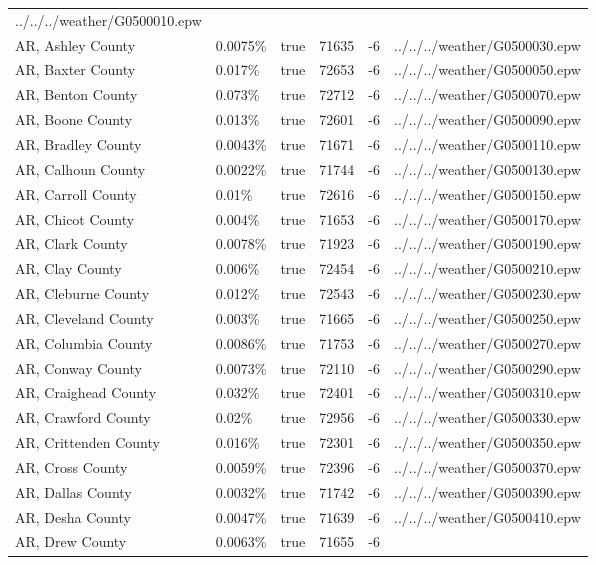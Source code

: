 \begin{longtable}[]{@{}llllll@{}}
../../../weather/G0500010.epw \\
AR, Ashley County & 0.0075\% & true & 71635 & -6 &
../../../weather/G0500030.epw \\
AR, Baxter County & 0.017\% & true & 72653 & -6 &
../../../weather/G0500050.epw \\
AR, Benton County & 0.073\% & true & 72712 & -6 &
../../../weather/G0500070.epw \\
AR, Boone County & 0.013\% & true & 72601 & -6 &
../../../weather/G0500090.epw \\
AR, Bradley County & 0.0043\% & true & 71671 & -6 &
../../../weather/G0500110.epw \\
AR, Calhoun County & 0.0022\% & true & 71744 & -6 &
../../../weather/G0500130.epw \\
AR, Carroll County & 0.01\% & true & 72616 & -6 &
../../../weather/G0500150.epw \\
AR, Chicot County & 0.004\% & true & 71653 & -6 &
../../../weather/G0500170.epw \\
AR, Clark County & 0.0078\% & true & 71923 & -6 &
../../../weather/G0500190.epw \\
AR, Clay County & 0.006\% & true & 72454 & -6 &
../../../weather/G0500210.epw \\
AR, Cleburne County & 0.012\% & true & 72543 & -6 &
../../../weather/G0500230.epw \\
AR, Cleveland County & 0.003\% & true & 71665 & -6 &
../../../weather/G0500250.epw \\
AR, Columbia County & 0.0086\% & true & 71753 & -6 &
../../../weather/G0500270.epw \\
AR, Conway County & 0.0073\% & true & 72110 & -6 &
../../../weather/G0500290.epw \\
AR, Craighead County & 0.032\% & true & 72401 & -6 &
../../../weather/G0500310.epw \\
AR, Crawford County & 0.02\% & true & 72956 & -6 &
../../../weather/G0500330.epw \\
AR, Crittenden County & 0.016\% & true & 72301 & -6 &
../../../weather/G0500350.epw \\
AR, Cross County & 0.0059\% & true & 72396 & -6 &
../../../weather/G0500370.epw \\
AR, Dallas County & 0.0032\% & true & 71742 & -6 &
../../../weather/G0500390.epw \\
AR, Desha County & 0.0047\% & true & 71639 & -6 &
../../../weather/G0500410.epw \\
AR, Drew County & 0.0063\% & true & 71655 & -6 &

\end{longtable}
